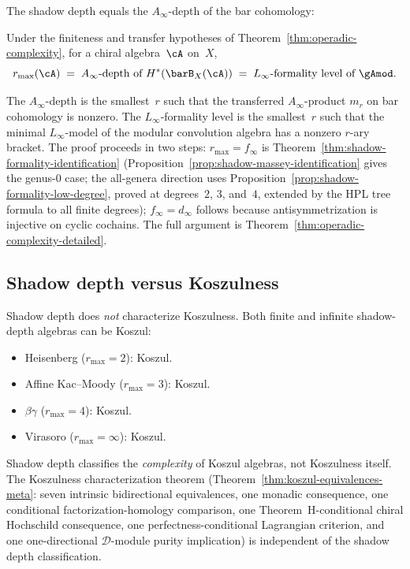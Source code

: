 The shadow depth equals the $A_\infty$-depth of the bar cohomology:

\begin{theorem}
\label{thm:thqg-intro-operadic-complexity}
Under the finiteness and transfer hypotheses of
Theorem~\textup{\ref{thm:operadic-complexity}}, for a chiral
algebra~$\cA$ on~$X$,
\[
r_{\max}(\cA) \;=\; \text{$A_\infty$-depth of $H^*(\barB_X(\cA))$}
\;=\; \text{$L_\infty$-formality level of $\gAmod$}.
\]
\end{theorem}

The $A_\infty$-depth is the smallest~$r$ such that the transferred
$A_\infty$-product $m_r$ on bar cohomology is nonzero. The
$L_\infty$-formality level is the smallest~$r$ such that the minimal
$L_\infty$-model of the modular convolution algebra has a nonzero
$r$-ary bracket. The proof proceeds in two steps: $r_{\max} = f_\infty$
is Theorem~\ref{thm:shadow-formality-identification}
(Proposition~\ref{prop:shadow-massey-identification} gives the
genus-$0$ case; the all-genera direction uses
Proposition~\ref{prop:shadow-formality-low-degree}, proved at
degrees~$2$, $3$, and~$4$, extended by the HPL tree formula to all
finite degrees); $f_\infty = d_\infty$ follows because antisymmetrization
is injective on cyclic cochains. The full argument is
Theorem~\ref{thm:operadic-complexity-detailed}.

\subsection{Shadow depth versus Koszulness}
\label{subsec:thqg-intro-depth-vs-koszulness}

Shadow depth does \emph{not} characterize Koszulness. Both finite and
infinite shadow-depth algebras can be Koszul:
\begin{itemize}
\item Heisenberg ($r_{\max} = 2$): Koszul.
\item Affine Kac--Moody ($r_{\max} = 3$): Koszul.
\item $\beta\gamma$ ($r_{\max} = 4$): Koszul.
\item Virasoro ($r_{\max} = \infty$): Koszul.
\end{itemize}
Shadow depth classifies the \emph{complexity} of Koszul algebras, not
Koszulness itself. The Koszulness characterization theorem
(Theorem~\ref{thm:koszul-equivalences-meta}: seven intrinsic
bidirectional equivalences, one monadic consequence, one conditional
factorization-homology comparison, one Theorem~H-conditional chiral
Hochschild consequence, one perfectness-conditional Lagrangian criterion, and one
one-directional $\mathcal{D}$-module purity implication) is independent
of the shadow depth classification.

